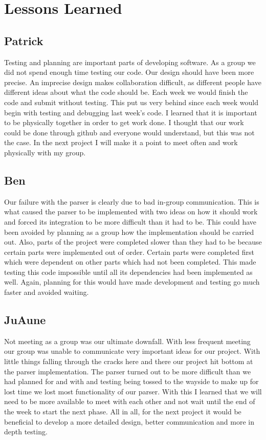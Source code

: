 \documentclass{article}
\begin{document}
\section{Lessons Learned}
\subsection{Patrick} Testing and planning are important parts of developing software. As a group we did not spend enough
time testing our code. Our design should have been more precise. An imprecise design makes collaboration
difficult, as different people have different ideas about what the code should be. Each week we would 
finish the code and submit without testing. This put us very behind since each week would begin with testing
and debugging last week's code. I learned that it is important to be physically together in order to get work 
done. I thought that our work could be done through github and everyone would understand, but this was not the case.
In the next project I will make it a point to meet often and work physically with my group.

\subsection{Ben}Our failure with the parser is clearly due to bad in-group communication. This is what caused the
parser to be implemented with two ideas on how it should work and forced its integration to be more difficult than
it had to be. This could have been avoided by planning as a group how the implementation should be carried out. Also,
parts of the project were completed slower than they had to be because certain parts were implemented out of order.
Certain parts were completed first which were dependent on other parts which had not been completed. This made testing
this code impossible until all its dependencies had been implemented as well. Again, planning for this would have made
development and testing go much faster and avoided waiting. 


\subsection{JuAune} Not meeting as a group was our ultimate downfall. With less frequent meeting our group was unable to 
communicate very important ideas for our project. With little things falling through the cracks here and there our 
project hit bottom at the parser implementation. The parser turned out to be more difficult than we had planned for and 
with and testing being tossed to the wayside to make up for lost time we lost most functionality of our parser. With this 
I learned that we will need to be more available to meet with each other and not wait until the end of the week to start 
the next phase. All in all, for the next project it would be beneficial to develop a more detailed design, better 
communication and more in depth testing.
\end{document}
